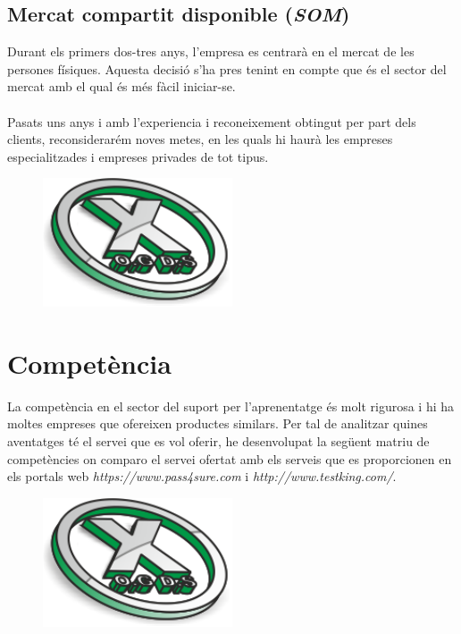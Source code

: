 \documentclass[12pt]{article}
\begin{document}
\subsection{Mercat compartit disponible (\textit{SOM})}
Durant els primers dos-tres anys, l'empresa es centrarà en el mercat de les persones físiques. Aquesta decisió s'ha pres tenint en compte que és el sector del mercat amb el qual és més fàcil iniciar-se. 
\\\\Pasats uns anys i amb l'experiencia i reconeixement obtingut per part dels clients, reconsiderarém noves metes, en les quals hi haurà les empreses especialitzades i empreses privades de tot tipus.
\begin{landscape}
\begin{figure}
	\centering
	\includegraphics[width=0.5\textwidth]{imatges/icon.png}\par\vspace{1cm}
\end{figure}
\end{landscape}



\clearpage
\section{Competència}
La competència en el sector del suport per l'aprenentatge és molt rigurosa i hi ha moltes empreses que ofereixen productes similars. Per tal de analitzar quines aventatges té el servei que es vol oferir, he desenvolupat la següent matriu de competències on comparo el servei ofertat amb els serveis que es proporcionen en els portals web \textit{https://www.pass4sure.com} i \textit{http://www.testking.com/}.
\begin{landscape}
\begin{figure}
	\centering
	\includegraphics[width=0.5\textwidth]{imatges/icon.png}\par\vspace{1cm}
\end{figure}
\end{landscape}
\clearpage
\end{document}
